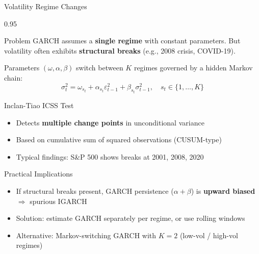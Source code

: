 \documentclass[9pt, aspectratio=169, t]{beamer}
\begin{document}
\begin{frame}{Volatility Regime Changes}
    \begin{cminipage}{0.95\textwidth}
    \scriptsize
    \setlength{\abovedisplayskip}{2pt}\setlength{\belowdisplayskip}{2pt}
    \vspace{-0.3cm}
    \begin{block}{Problem}
        GARCH assumes a \textbf{single regime} with constant parameters. But volatility often exhibits \textbf{structural breaks} (e.g., 2008 crisis, COVID-19).
    \end{block}
    \vspace{-0.2cm}
    \begin{defn}
        Parameters $(\omega, \alpha, \beta)$ switch between $K$ regimes governed by a hidden Markov chain:
        \[
            \sigma_t^2 = \omega_{s_t} + \alpha_{s_t} \varepsilon_{t-1}^2 + \beta_{s_t} \sigma_{t-1}^2, \quad s_t \in \{1, \ldots, K\}
        \]
    \end{defn}
    \vspace{-0.2cm}
    \begin{exampleblock}{Inclan-Tiao ICSS Test}
        \begin{itemize}\setlength{\itemsep}{0pt}
            \item Detects \textbf{multiple change points} in unconditional variance
            \item Based on cumulative sum of squared observations (CUSUM-type)
            \item Typical findings: S\&P 500 shows breaks at 2001, 2008, 2020
        \end{itemize}
    \end{exampleblock}
    \vspace{-0.2cm}
    \begin{alertblock}{Practical Implications}
        \begin{itemize}\setlength{\itemsep}{0pt}
            \item If structural breaks present, GARCH persistence ($\alpha + \beta$) is \textbf{upward biased} $\Rightarrow$ spurious IGARCH
            \item Solution: estimate GARCH separately per regime, or use rolling windows
            \item Alternative: Markov-switching GARCH with $K=2$ (low-vol / high-vol regimes)
        \end{itemize}
    \end{alertblock}
    \end{cminipage}
\end{frame}
\end{document}

